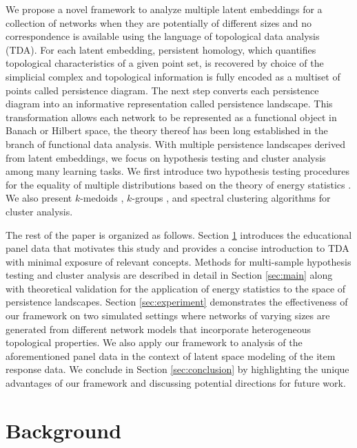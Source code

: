 \documentclass[12pt]{article}
\begin{document}
We propose a novel framework to analyze multiple latent embeddings for a collection of networks when they are potentially of different sizes and no correspondence is available using the language of topological data analysis (TDA). For each latent embedding, persistent homology, which quantifies topological characteristics of a given point set, is recovered by choice of the simplicial complex and topological information is fully encoded as a multiset of points called persistence diagram. The next step converts each persistence diagram into an informative representation called persistence landscape. This transformation allows each network to be represented as a functional object in Banach or Hilbert space, the theory thereof has been long established in the branch of functional data analysis. With multiple persistence landscapes derived from latent embeddings, we focus on hypothesis testing and cluster analysis among many learning tasks. We first introduce two hypothesis testing procedures for the equality of multiple distributions based on the theory of energy statistics \citep{szekely_e-statistics_2002, szekely_energy_2017}. We also present $k$-medoids \citep{kaufman_partitioning_1990}, $k$-groups \citep{li_k-groups_2017}, and spectral clustering \citep{von_luxburg_tutorial_2007-1} algorithms for cluster analysis. 


The rest of the paper is organized as follows. Section \ref{sec:background} introduces the educational panel data that motivates this study and provides a concise introduction to TDA with minimal exposure of relevant concepts. Methods for multi-sample hypothesis testing and cluster analysis are described in detail in Section \ref{sec:main} along with theoretical validation for the application of energy statistics to the space of persistence landscapes. Section \ref{sec:experiment} demonstrates the effectiveness of our framework on two simulated settings where networks of varying sizes are generated from different network models that incorporate heterogeneous topological properties.  We also apply our framework to analysis of the aforementioned panel data in the context of latent space modeling of the item response data. We conclude in Section \ref{sec:conclusion} by highlighting the unique advantages of our framework and discussing potential directions for future work.


\section{Background}\label{sec:background}
\end{document}
